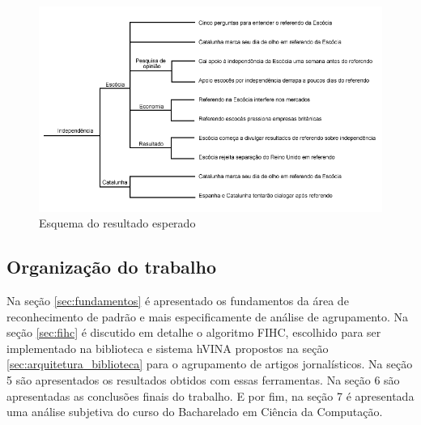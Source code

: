\documentclass[a4paper,12pt]{article}
\begin{document}
\begin{figure}[H]
    \begin{center}
        \includegraphics[scale=0.5]{resultado.png}
    \end{center}
    \caption{Esquema do resultado esperado}
    \label{fig:resultado}
\end{figure}

\subsection{Organização do trabalho}


Na seção \ref{sec:fundamentos} é apresentado os fundamentos da área de reconhecimento de padrão e mais especificamente de análise de agrupamento. Na seção \ref{sec:fihc} é discutido em detalhe o algoritmo FIHC, escolhido para ser implementado na biblioteca e sistema hVINA propostos na seção \ref{sec:arquitetura_biblioteca} para o agrupamento de artigos jornalísticos. Na seção 5 são apresentados os resultados obtidos com essas ferramentas. Na seção 6 são apresentadas as conclusões finais do trabalho. E por fim, na seção 7 é apresentada uma análise subjetiva do curso do Bacharelado em Ciência da Computação.
\end{document}
